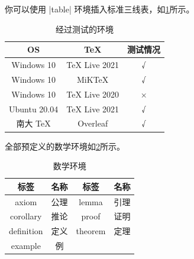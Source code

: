 你可以使用 |table| 环境插入标准三线表，如\cref{tab:testtab}所示。

\begin{table}[htbp]
    \caption{经过测试的环境}
    \label{tab:testtab}
    \begin{tabular}{ccc}
        \toprule
        OS           & TeX           & 测试情况 \\
        \midrule
        Windows 10   & TeX Live 2021 & √        \\
        Windows 10   & MiKTeX        & √        \\
        Windows 10   & TeX Live 2020 & ×        \\
        Ubuntu 20.04 & TeX Live 2021 & √        \\
        南大 TeX     & Overleaf      & √        \\
        \bottomrule
    \end{tabular}
\end{table}

全部预定义的数学环境如\cref{tab:mathenv}所示。

\begin{table}[htbp]
    \caption{数学环境}
    \label{tab:mathenv}
    \begin{tabular}{cc|cc}
        \toprule
        标签       & 名称 & 标签       & 名称 \\
        \midrule
        axiom      & 公理 & lemma      & 引理 \\
        corollary  & 推论 & proof      & 证明 \\
        definition & 定义 & theorem    & 定理 \\
        example    & 例   &            &      \\
        \bottomrule
    \end{tabular}
\end{table}
